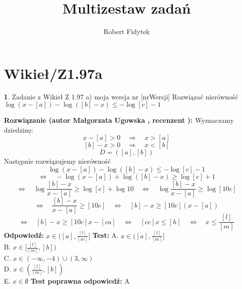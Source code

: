 \documentclass[12pt, a4paper]{article}
\title{Multizestaw zadań}
\author{Robert Fidytek}
\date{}
\theoremstyle{definition} %
\newtheorem{zad}{}
\newcommand{\kategoria}[1]{\section{#1}} %
\newcommand{\zadStart}[1]{\begin{zad}#1\newline} %
\newcommand{\zadStop}{\end{zad}}   %
\newcommand{\rozwStart}[2]{\noindent \textbf{Rozwiązanie (autor #1 , recenzent #2): }\newline} %
\newcommand{\rozwStop}{\newline}                                            %
\newcommand{\odpStart}{\noindent \textbf{Odpowiedź:}\newline}    %
\newcommand{\odpStop}{\newline}                                             %
\newcommand{\testStart}{\noindent \textbf{Test:}\newline} %
\newcommand{\testStop}{\newline} %
\newcommand{\kluczStart}{\noindent \textbf{Test poprawna odpowiedź:}\newline} %
\newcommand{\kluczStop}{\newline} %
\begin{document}
\maketitle


\kategoria{Wikieł/Z1.97a}
\zadStart{Zadanie z Wikieł Z 1.97 a) moja wersja nr [nrWersji]}
Rozwiązać nierówno\'sć $\log{(x-[a])}-\log{([b]-x)} \le - \log{[c]}-1$
\zadStop
\rozwStart{Małgorzata Ugowska}{}
Wyznaczamy dziedzinę:
$$x-[a]>0 \quad \Longrightarrow \quad x>[a]$$
$$[b] -x>0 \quad \Longrightarrow \quad x<[b]$$
$$D = ([a], [b])$$
Następnie rozwiązujemy nierówno\'sć
$$\log{(x-[a])}-\log{([b]-x)} \le - \log{[c]}-1$$
$$ \Longleftrightarrow \quad -\log{(x-[a])}+\log{([b]-x)} \ge  \log{[c]}+1 $$
$$\Longleftrightarrow \quad \log{\frac{[b]-x}{x-[a]}} \ge  \log{[c]}+\log{10} \quad \Longleftrightarrow \quad \log{\frac{[b]-x}{x-[a]}} \ge \log{[10c]}$$
$$ \Longleftrightarrow \quad \frac{[b]-x}{x-[a]} \ge [10c] \quad \Longleftrightarrow \quad [b]-x \ge [10c] (x-[a])$$
$$ \Longleftrightarrow \quad [b]-x \ge [10c]x-[ca] \quad \Longleftrightarrow \quad [cc]x \le [h] \quad \Longleftrightarrow \quad x \le \frac{[l]}{[m]}$$
\rozwStop
\odpStart
$x \in ([a], \frac{[l]}{[m]}]$
\odpStop
\testStart
A. $x \in ([a], \frac{[l]}{[m]}]$\\
B. $x \in [\frac{[l]}{[m]},[b])$\\
C. $x \in (-\infty, -4) \cup (3,\infty)$\\
D. $x \in (\frac{[l]}{[m]},[b])$\\
E. $x \in \emptyset$
\testStop
\kluczStart
A
\kluczStop
\end{document}
